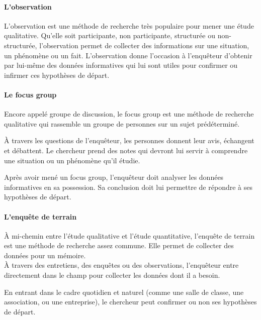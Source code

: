 \paragraph{L'observation} 

\noindent

	L’observation est une méthode de recherche très populaire pour mener une étude qualitative. Qu’elle soit participante, non participante, structurée ou non-structurée, l’observation permet de collecter des informations sur une situation, un phénomène ou un fait. L’observation donne l’occasion à l’enquêteur d’obtenir par lui-même des données informatives qui lui sont utiles pour confirmer ou infirmer ces hypothèses de départ.

\paragraph{Le focus group}

\noindent

Encore appelé groupe de discussion, le focus group est une méthode de recherche qualitative qui rassemble un groupe de personnes sur un sujet prédéterminé. 

\noindent

	À travers les questions de l’enquêteur, les personnes donnent leur avis, échangent et débattent. Le chercheur prend des notes qui devront lui servir à comprendre une situation ou un phénomène qu’il étudie.\\

\noindent

	Après avoir mené un focus group, l’enquêteur doit analyser les données informatives en sa possession. Sa conclusion doit lui permettre de répondre à ses hypothèses de départ.
	
\paragraph{L'enquête de terrain} 

\noindent

	À mi-chemin entre l’étude qualitative et l’étude quantitative, l’enquête de terrain est une méthode de recherche assez commune. Elle permet de collecter des données pour un mémoire.\\
À travers des entretiens, des enquêtes ou des observations, l’enquêteur entre directement dans le champ pour collecter les données dont il a besoin.

\noindent

En entrant dans le cadre quotidien et naturel (comme une salle de classe, une association, ou une entreprise), le chercheur peut confirmer ou non ses hypothèses de départ.

